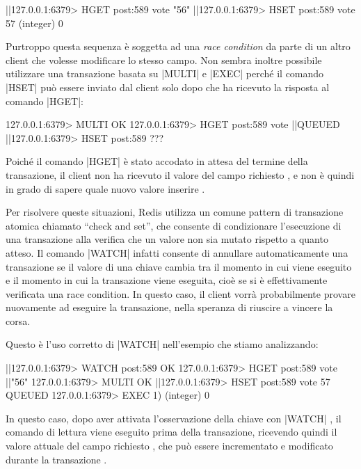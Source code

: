 \begin{commentedsource}[style=redis]
|\lnote|127.0.0.1:6379> HGET post:589 vote
"56"
|\lnote|127.0.0.1:6379> HSET post:589 vote 57
(integer) 0
\end{commentedsource}

Purtroppo questa sequenza è soggetta ad una \emph{race condition} da parte di un altro client che
volesse modificare lo stesso campo. Non sembra inoltre possibile utilizzare una transazione basata
su \cverb|MULTI| e \cverb|EXEC| perché il comando \cverb|HSET| può essere inviato dal client solo dopo
che ha ricevuto la risposta al comando \cverb|HGET|:

\begin{commentedsource}[style=redis]
127.0.0.1:6379> MULTI
OK
127.0.0.1:6379> HGET post:589 vote
|\lnote|QUEUED
|\lnote|127.0.0.1:6379> HSET post:589 ???
\end{commentedsource}

Poiché il comando \cverb|HGET| è stato accodato in attesa del termine della transazione, il client
non ha ricevuto il valore del campo richiesto , e non è quindi in grado di sapere quale
nuovo valore inserire .

Per risolvere queste situazioni, Redis utilizza un comune pattern di transazione atomica chiamato
``check and set'', che consente di condizionare l'esecuzione di una transazione alla verifica che un
valore non sia mutato rispetto a quanto atteso. Il comando \cverb|WATCH| infatti consente di
annullare automaticamente una transazione se il valore di una chiave cambia tra il momento in cui
viene eseguito e il momento in cui la transazione viene eseguita, cioè se si è effettivamente
verificata una race condition. In questo caso, il client vorrà probabilmente provare nuovamente ad
eseguire la transazione, nella speranza di riuscire a vincere la corsa.

Questo è l'uso corretto di \cverb|WATCH| nell'esempio che stiamo a\-na\-liz\-zan\-do:

\begin{commentedsource}[style=redis]
|\lnote|127.0.0.1:6379> WATCH post:589
OK
127.0.0.1:6379> HGET post:589 vote
|\lnote|"56"
127.0.0.1:6379> MULTI
OK
|\lnote|127.0.0.1:6379> HSET post:589 vote 57
QUEUED
127.0.0.1:6379> EXEC
1) (integer) 0
\end{commentedsource}

In questo caso, dopo aver attivata l'osservazione della chiave con \cverb|WATCH| , il
comando di lettura viene eseguito prima della transazione, ricevendo quindi il valore
attuale del campo richiesto , che può essere incrementato e modificato durante la transazione
.


